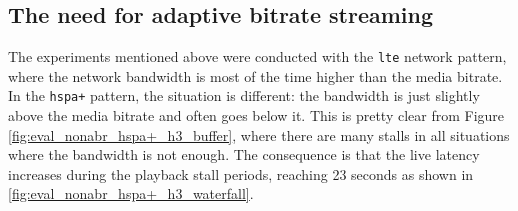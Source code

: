 \subsection{The need for adaptive bitrate streaming}
\label{sec:eval/non-abr/adaptive}

The experiments mentioned above were conducted with the \texttt{lte} network pattern, where the network bandwidth is most of the time higher than the media bitrate. In the \texttt{hspa+} pattern, the situation is different: the bandwidth is just slightly above the media bitrate and often goes below it. This is pretty clear from Figure \ref{fig:eval_nonabr_hspa+_h3_buffer}, where there are many stalls in all situations where the bandwidth is not enough. The consequence is that the live latency increases during the playback stall periods, reaching 23 seconds as shown in \ref{fig:eval_nonabr_hspa+_h3_waterfall}.

